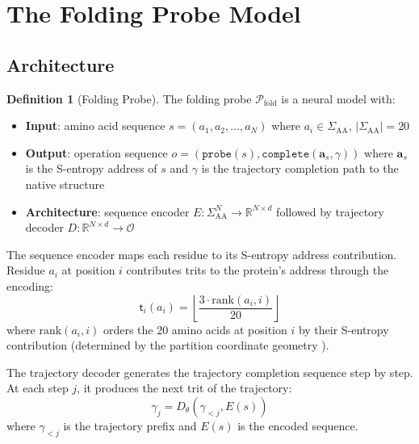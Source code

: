 \documentclass[11pt,twocolumn,a4paper]{article}
\theoremstyle{definition}
\newtheorem{definition}[theorem]{Definition}
\theoremstyle{remark}
\newcommand{\R}{\mathbb{R}}
\newcommand{\params}{\theta}
\newcommand{\opspace}{\mathcal{O}}
\newcommand{\addr}{\mathbf{a}}
\newcommand{\trit}{\mathsf{t}}
\newcommand{\probe}{\mathcal{P}}
\begin{document}
\section{The Folding Probe Model}
\label{sec:folding_probe}

\subsection{Architecture}

\begin{definition}[Folding Probe]
\label{def:folding_probe}
The folding probe $\probe_{\text{fold}}$ is a neural model with:
\begin{itemize}
    \item \textbf{Input}: amino acid sequence $s = (a_1, a_2, \ldots, a_N)$ where $a_i \in \Sigma_{\text{AA}}$, $|\Sigma_{\text{AA}}| = 20$
    \item \textbf{Output}: operation sequence $o = (\texttt{probe}(s), \texttt{complete}(\addr_s, \gamma))$ where $\addr_s$ is the S-entropy address of $s$ and $\gamma$ is the trajectory completion path to the native structure
    \item \textbf{Architecture}: sequence encoder $E: \Sigma_{\text{AA}}^N \to \R^{N \times d}$ followed by trajectory decoder $D: \R^{N \times d} \to \opspace$
\end{itemize}
\end{definition}

The sequence encoder maps each residue to its S-entropy address contribution. Residue $a_i$ at position $i$ contributes trits to the protein's address through the encoding:
\begin{equation}
\trit_i(a_i) = \left\lfloor \frac{3 \cdot \text{rank}(a_i, i)}{20} \right\rfloor
\end{equation}
where $\text{rank}(a_i, i)$ orders the 20 amino acids at position $i$ by their S-entropy contribution (determined by the partition coordinate geometry \citep{sachikonye2025a}).

The trajectory decoder generates the trajectory completion sequence step by step. At each step $j$, it produces the next trit of the trajectory:
\begin{equation}
\gamma_j = D_\params(\gamma_{<j}, E(s))
\end{equation}
where $\gamma_{<j}$ is the trajectory prefix and $E(s)$ is the encoded sequence.
\end{document}
